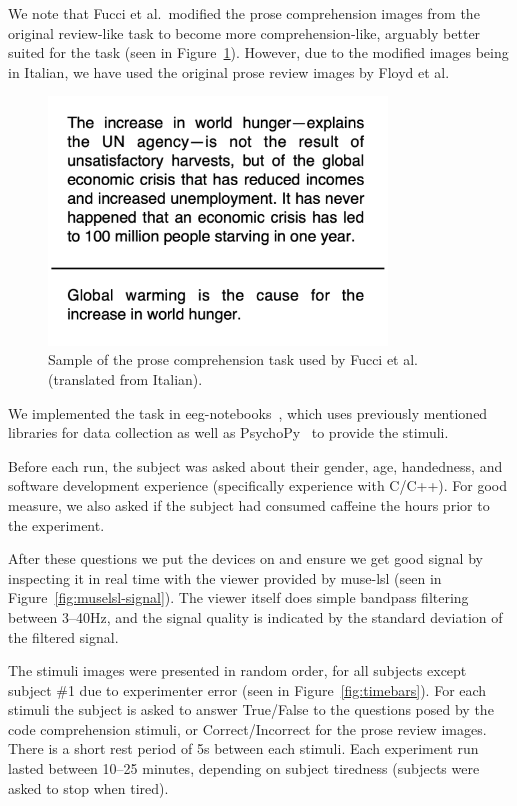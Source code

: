             We note that Fucci et al.~modified the prose comprehension images from the original review-like task to become more comprehension-like, arguably better suited for the task (seen in Figure~\ref{fig:prose-comp-fucci}). However, due to the modified images being in Italian, we have used the original prose review images by Floyd et al.

            \begin{figure}[H]
                \centering
                \includegraphics[width=90mm]{img/prose-comprehension.png}
                \caption{Sample of the prose comprehension task used by Fucci et al. (translated from Italian).}\label{fig:prose-comp-fucci}
            \end{figure}

            We implemented the task in eeg-notebooks~\cite{barachant_eeg-notebooks_2020}, which uses previously mentioned libraries for data collection as well as PsychoPy~\cite{peirce_psychopy2_2019} to provide the stimuli.

            Before each run, the subject was asked about their gender, age, handedness, and software development experience (specifically experience with C/C++). For good measure, we also asked if the subject had consumed caffeine the hours prior to the experiment.

            After these questions we put the devices on and ensure we get good signal by inspecting it in real time with the viewer provided by muse-lsl (seen in Figure~\ref{fig:muselsl-signal}). The viewer itself does simple bandpass filtering between 3--40Hz, and the signal quality is indicated by the standard deviation of the filtered signal.

            The stimuli images were presented in random order, for all subjects except subject \#1 due to experimenter error (seen in Figure~\ref{fig:timebars}). For each stimuli the subject is asked to answer True/False to the questions posed by the code comprehension stimuli, or Correct/Incorrect for the prose review images. There is a short rest period of 5s between each stimuli. Each experiment run lasted between 10--25 minutes, depending on subject tiredness (subjects were asked to stop when tired).

